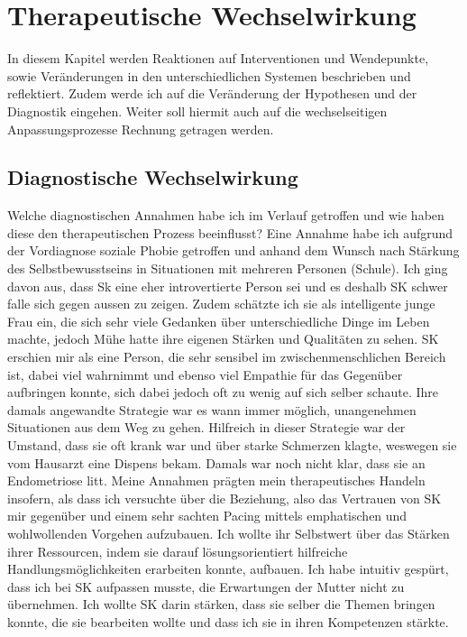 \section{Therapeutische Wechselwirkung} \label{sec:TherapeutischeWechselwirkung}
In diesem Kapitel werden Reaktionen auf Interventionen und Wendepunkte, sowie Veränderungen in den unterschiedlichen Systemen beschrieben und reflektiert. Zudem werde ich auf die Veränderung der Hypothesen und der Diagnostik eingehen. Weiter soll hiermit auch auf die wechselseitigen Anpassungsprozesse Rechnung getragen werden. 

\subsection{Diagnostische Wechselwirkung} \label{sc:diagnostischeWechselwirkung}
Welche diagnostischen Annahmen habe ich im Verlauf getroffen und wie haben diese den therapeutischen Prozess beeinflusst? Eine Annahme habe ich aufgrund der Vordiagnose soziale Phobie getroffen und anhand dem Wunsch nach Stärkung des Selbstbewusstseins in Situationen mit mehreren Personen (Schule). Ich ging davon aus, dass Sk eine eher introvertierte Person sei und es deshalb SK schwer falle sich gegen aussen zu zeigen. Zudem schätzte ich sie als intelligente junge Frau ein, die sich sehr viele Gedanken über unterschiedliche Dinge im Leben machte, jedoch Mühe hatte ihre eigenen Stärken und Qualitäten zu sehen. SK erschien mir als eine Person, die sehr sensibel im zwischenmenschlichen Bereich ist, dabei viel wahrnimmt und ebenso viel Empathie für das Gegenüber aufbringen konnte, sich dabei jedoch oft zu wenig auf sich selber schaute. Ihre damals angewandte Strategie war es wann immer möglich, unangenehmen Situationen aus dem Weg zu gehen. Hilfreich in dieser Strategie war der Umstand, dass sie oft krank war und über starke Schmerzen klagte, weswegen sie vom Hausarzt eine Dispens bekam. Damals war noch nicht klar, dass sie an Endometriose litt. Meine Annahmen prägten mein therapeutisches Handeln insofern, als dass ich versuchte über die Beziehung, also das Vertrauen von SK mir gegenüber und einem sehr sachten Pacing mittels emphatischen und wohlwollenden Vorgehen aufzubauen. Ich wollte ihr Selbstwert über das Stärken ihrer Ressourcen, indem sie darauf lösungsorientiert hilfreiche Handlungsmöglichkeiten erarbeiten konnte, aufbauen. Ich habe intuitiv gespürt, dass ich bei SK aufpassen musste, die Erwartungen der Mutter nicht zu übernehmen. Ich wollte SK darin stärken, dass sie selber die Themen bringen konnte, die sie bearbeiten wollte und dass ich sie in ihren Kompetenzen stärkte. 

